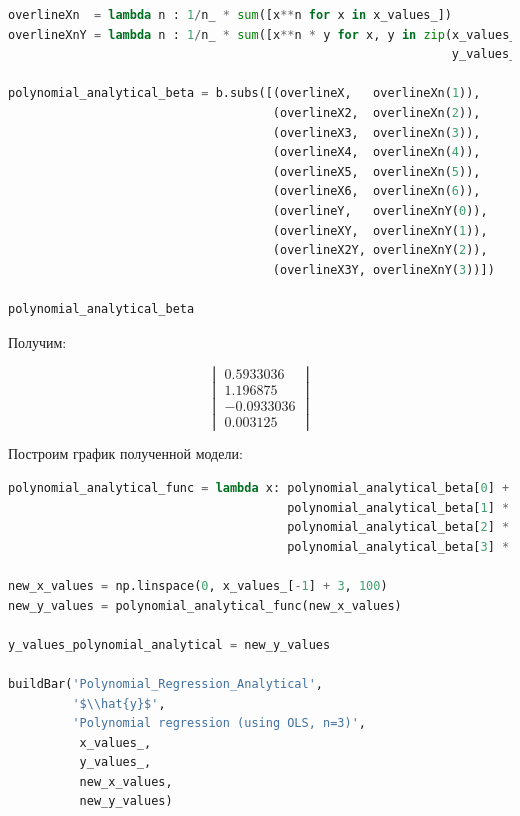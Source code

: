 \documentclass[a4paper, 14pt]{extarticle}
\begin{document}
\begin{center}
    \begin{lstlisting}[language=Python]
overlineXn  = lambda n : 1/n_ * sum([x**n for x in x_values_])
overlineXnY = lambda n : 1/n_ * sum([x**n * y for x, y in zip(x_values_, 
                                                              y_values_)])

polynomial_analytical_beta = b.subs([(overlineX,   overlineXn(1)), 
                                     (overlineX2,  overlineXn(2)), 
                                     (overlineX3,  overlineXn(3)), 
                                     (overlineX4,  overlineXn(4)), 
                                     (overlineX5,  overlineXn(5)), 
                                     (overlineX6,  overlineXn(6)),
                                     (overlineY,   overlineXnY(0)),
                                     (overlineXY,  overlineXnY(1)),
                                     (overlineX2Y, overlineXnY(2)),
                                     (overlineX3Y, overlineXnY(3))])

polynomial_analytical_beta
    \end{lstlisting}
\end{center}

Получим:

\begin{equation*}
    \begin{vmatrix}
        0.5933036 \\
        1.196875 \\
        -0.0933036 \\
        0.003125
    \end{vmatrix}
\end{equation*}

Построим график полученной модели:

\begin{center}
    \begin{lstlisting}[language=Python]
polynomial_analytical_func = lambda x: polynomial_analytical_beta[0] + \
                                       polynomial_analytical_beta[1] * x + \
                                       polynomial_analytical_beta[2] * x**2 + \
                                       polynomial_analytical_beta[3] * x**3

new_x_values = np.linspace(0, x_values_[-1] + 3, 100)
new_y_values = polynomial_analytical_func(new_x_values)

y_values_polynomial_analytical = new_y_values

buildBar('Polynomial_Regression_Analytical', 
         '$\\hat{y}$', 
         'Polynomial regression (using OLS, n=3)',
          x_values_, 
          y_values_, 
          new_x_values, 
          new_y_values)
    \end{lstlisting}
\end{center}
\end{document}
